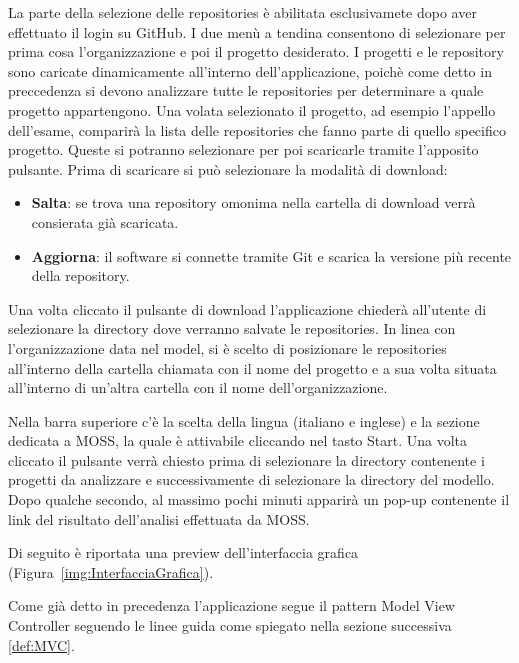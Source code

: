 		La parte della selezione delle repositories è abilitata esclusivamete dopo aver effettuato il login su GitHub. I due menù a tendina consentono di selezionare per prima cosa l'organizzazione e poi il progetto desiderato.
		I progetti e le repository sono caricate dinamicamente all'interno dell'applicazione, poichè come detto in preccedenza si devono analizzare tutte le repositories per determinare a quale progetto appartengono.
		Una volata selezionato il progetto, ad esempio l'appello dell'esame, comparirà la lista delle repositories che fanno parte di quello specifico progetto. Queste si potranno selezionare per poi scaricarle tramite l'apposito pulsante.
		Prima di scaricare si può selezionare la modalità di download:
		\begin{itemize}
			\item \textbf{Salta}: se trova una repository omonima nella cartella di download verrà consierata già scaricata.
			\item \textbf{Aggiorna}: il software si connette tramite Git e scarica la versione più recente della repository.
		\end{itemize}
		Una volta cliccato il pulsante di download l'applicazione chiederà all'utente di selezionare la directory dove verranno salvate le repositories.
		In linea con l'organizzazione data nel model, si è scelto di posizionare le repositories all'interno della cartella chiamata con il nome del progetto e a sua volta situata all'interno di un'altra cartella con il nome dell'organizzazione.
		
		Nella barra superiore c'è la scelta della lingua (italiano e inglese) e la sezione dedicata a MOSS, la quale è attivabile cliccando nel tasto Start. Una volta cliccato il pulsante verrà chiesto prima di selezionare la directory contenente i progetti da analizzare e successivamente di selezionare la directory del modello. Dopo qualche secondo, al massimo pochi minuti apparirà un pop-up contenente il link del risultato dell'analisi effettuata da MOSS.
		
		Di seguito è riportata una preview dell'interfaccia grafica (Figura~\ref{img:InterfacciaGrafica}).
		
		\begin{center}
			\label{img:InterfacciaGrafica}
		\end{center}
		
		Come già detto in precedenza l'applicazione segue il pattern Model View Controller seguendo le linee guida come spiegato nella sezione successiva \ref{def:MVC}.
		
